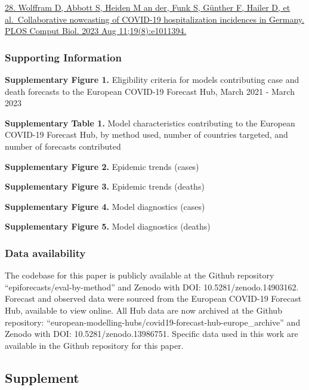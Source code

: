 \documentclass[
  letterpaper,
  DIV=11,
  numbers=noendperiod]{scrartcl}
\begin{document}
\begin{tcolorbox}
\href{https://www.zotero.org/google-docs/?7SKDbN}{28. Wolffram D, Abbott
S, Heiden M an der, Funk S, Günther F, Hailer D, et al.~Collaborative
nowcasting of COVID-19 hospitalization incidences in Germany. PLOS
Comput Biol. 2023 Aug 11;19(8):e1011394.}

\subsubsection{Supporting Information}\label{supporting-information}

\textbf{Supplementary Figure 1.} Eligibility criteria for models
contributing case and death forecasts to the European COVID-19 Forecast
Hub, March 2021 - March 2023

\textbf{Supplementary Table 1.} Model characteristics contributing to
the European COVID-19 Forecast Hub, by method used, number of countries
targeted, and number of forecasts contributed

\textbf{Supplementary Figure 2.} Epidemic trends (cases)

\textbf{Supplementary Figure 3.} Epidemic trends (deaths)

\textbf{Supplementary Figure 4.} Model diagnostics (cases)

\textbf{Supplementary Figure 5.} Model diagnostics (deaths)

\subsubsection{Data availability}\label{data-availability}

The codebase for this paper is publicly available at the Github
repository ``epiforecasts/eval-by-method'' and Zenodo with DOI:
10.5281/zenodo.14903162. Forecast and observed data were sourced from
the European COVID-19 Forecast Hub, available to view online. All Hub
data are now archived at the Github repository:
``european-modelling-hubs/covid19-forecast-hub-europe\_archive'' and
Zenodo with DOI: 10.5281/zenodo.13986751. Specific data used in this
work are available in the Github repository for this paper.

\end{tcolorbox}

\subsection{Supplement}\label{supplement}
\end{document}
